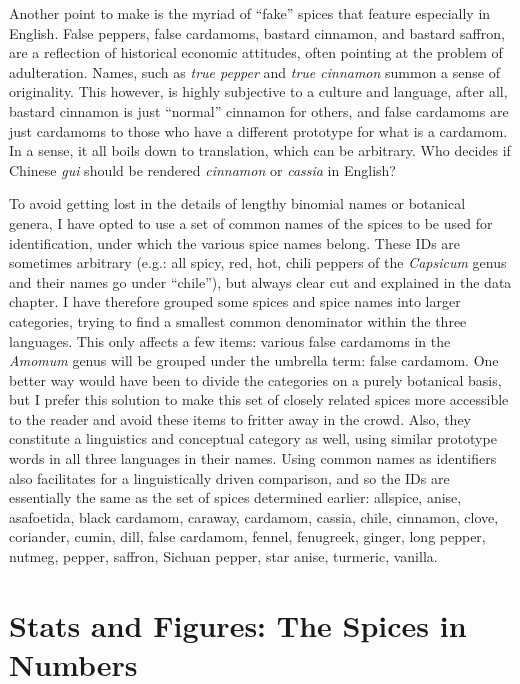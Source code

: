 Another point to make is the myriad of ``fake'' spices that feature especially in English. False peppers, false cardamoms, bastard cinnamon, and bastard saffron, are a reflection of historical economic attitudes, often pointing at the problem of adulteration. Names, such as \textit{true pepper} and \textit{true cinnamon} summon a sense of originality. This however, is highly subjective to a culture and language, after all, bastard cinnamon is just ``normal'' cinnamon for others, and false cardamoms are just cardamoms to those who have a different prototype for what is a cardamom. In a sense, it all boils down to translation, which can be arbitrary. Who decides if Chinese  \textit{gui} should be rendered \textit{cinnamon} or \textit{cassia} in English? 

To avoid getting lost in the details of lengthy binomial names or botanical genera, I have opted to use a set of common names of the spices to be used for identification, under which the various spice names belong. These IDs are sometimes arbitrary (e.g.: all spicy, red, hot, chili peppers of the \textit{Capsicum} genus and their names go under ``chile''), but always clear cut and explained in the data chapter. I have therefore grouped some spices and spice names into larger categories, trying to find a smallest common denominator within the three languages. This only affects a few items: various false cardamoms in the \textit{Amomum} genus will be grouped under the umbrella term: false cardamom. One better way would have been to divide the categories on a purely botanical basis, but I prefer this solution to make this set of closely related spices more accessible to the reader and avoid these items to fritter away in the crowd. Also, they constitute a linguistics and conceptual category as well, using similar prototype words in all three languages in their names. Using common names as identifiers also facilitates for a linguistically driven comparison, and so the IDs are essentially the same as the set of spices determined earlier: 
allspice, anise, asafoetida, black cardamom, caraway, cardamom, cassia, chile, cinnamon, clove, coriander, cumin, dill, false cardamom, fennel, fenugreek, ginger, long pepper, nutmeg, pepper, saffron, Sichuan pepper, star anise, turmeric, vanilla.

\section{Stats and Figures: The Spices in Numbers}

